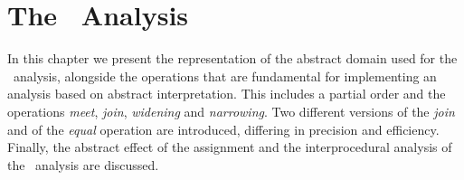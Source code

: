 \chapter{The \cpo\ Analysis}

In this chapter we present the representation of the abstract domain used for the \cpo\ analysis, alongside the operations that are fundamental for implementing an analysis based on abstract interpretation.
This includes a partial order and the operations \emph{meet}, \emph{join}, \emph{widening} and \emph{narrowing}.
Two different versions of the \emph{join} and of the \emph{equal} operation are introduced,
differing in precision and efficiency.
Finally, the abstract effect of the assignment and the interprocedural analysis of the \cpo\ analysis are discussed.





